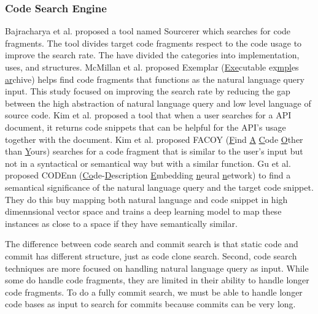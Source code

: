 \subsubsection{Code Search Engine}
Bajracharya et al. \cite{bajracharya2006sourcerer} proposed a tool named Sourcerer which searches for code fragments.
The tool divides target code fragments respect to the code usage to improve the search rate.
The have divided the categories into implementation, uses, and structures.
McMillan et al. \cite{mcmillan2011exemplar} proposed Exemplar (\underline{Exe}cutable ex\underline{mpl}es \underline{ar}chive) helps find code fragments that functions as the natural language query input.
This study focused on improving the search rate by reducing the gap between the high abstraction of natural language query and low level language of source code.
Kim et al. \cite{kim2010towards} proposed a tool that when a user searches for a API document, it returns code snippets that can be helpful for the API's usage together with the document.
Kim et al. \cite{kim2018facoy} proposed FACOY (\underline{F}ind \underline{A} \underline{C}ode \underline{O}ther than \underline{Y}ours) searches for a code fragment that is similar to the user's input but not in a syntactical or semantical way but with a similar function.
Gu et al. \cite{gu2018deep} proposed CODEnn (\underline{Co}de-\underline{D}escription \underline{E}mbedding \underline{n}eural \underline{n}etwork) to find a semantical significance of the natural language query and the target code snippet.
They do this buy mapping both natural language and code snippet in high dimennsional vector space and trains a deep learning model to map these instances as close to a space if they have semantically similar.

The difference between code search and commit search is that static code and commit has different structure, just as code clone search.
Second, code search techniques are more focused on handling natural language query as input.
While some do handle code fragments, they are limited in their ability to handle longer code fragments. 
To do a fully commit search, we must be able to handle longer code bases as input to search for commits because commits can be very long.

